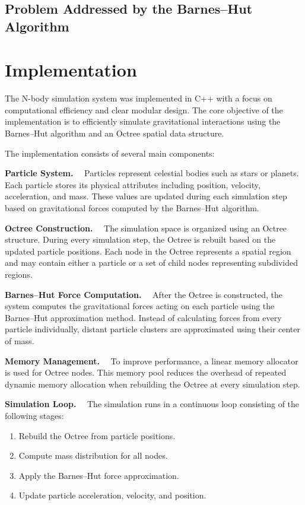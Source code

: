 \subsection{Problem Addressed by the Barnes--Hut Algorithm}
\section{Implementation}

The N-body simulation system was implemented in C++ with a focus on computational efficiency and clear modular design. The core objective of the implementation is to efficiently simulate gravitational interactions using the Barnes--Hut algorithm and an Octree spatial data structure.

The implementation consists of several main components:

\textbf{Particle System.}  
Particles represent celestial bodies such as stars or planets. Each particle stores its physical attributes including position, velocity, acceleration, and mass. These values are updated during each simulation step based on gravitational forces computed by the Barnes--Hut algorithm.

\textbf{Octree Construction.}  
The simulation space is organized using an Octree structure. During every simulation step, the Octree is rebuilt based on the updated particle positions. Each node in the Octree represents a spatial region and may contain either a particle or a set of child nodes representing subdivided regions.

\textbf{Barnes--Hut Force Computation.}  
After the Octree is constructed, the system computes the gravitational forces acting on each particle using the Barnes--Hut approximation method. Instead of calculating forces from every particle individually, distant particle clusters are approximated using their center of mass.

\textbf{Memory Management.}  
To improve performance, a linear memory allocator is used for Octree nodes. This memory pool reduces the overhead of repeated dynamic memory allocation when rebuilding the Octree at every simulation step.

\textbf{Simulation Loop.}  
The simulation runs in a continuous loop consisting of the following stages:

\begin{enumerate}
\item Rebuild the Octree from particle positions.
\item Compute mass distribution for all nodes.
\item Apply the Barnes--Hut force approximation.
\item Update particle acceleration, velocity, and position.
\end{enumerate}

